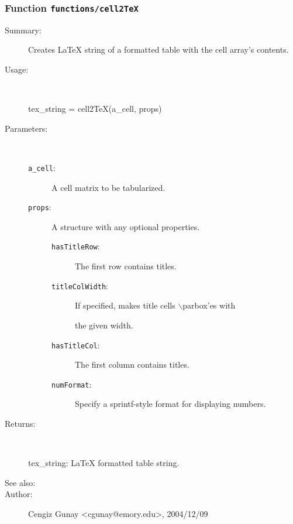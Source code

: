 \subsubsection[Function \texttt{cell2TeX}]{Function \texttt{functions/cell2TeX}}%
%
\label{ref_functions__cell2TeX}%
\hypertarget{ref_functions__cell2TeX}{}%
\begin{description}
\item[Summary:]Creates LaTeX string of a formatted table with the cell array's contents.
%
\item[Usage:]~%
\begin{lyxcode}%
tex\_string = cell2TeX(a\_cell, props)
%
\end{lyxcode}%
%
%
\item[Parameters:]~
\begin{description}%
\item[\texttt{a\_cell}:]
 A cell matrix to be tabularized.
\item[\texttt{props}:]
 A structure with any optional properties.
\begin{description}%
\item[\texttt{hasTitleRow}:]
 The first row contains titles.
\item[\texttt{titleColWidth}:]
 If specified, makes title cells $\backslash$parbox'es with

the given width.
\item[\texttt{hasTitleCol}:]
 The first column contains titles.
\item[\texttt{numFormat}:]
 Specify a sprintf-style format for displaying numbers.
\end{description}%
\end{description}%
%
\item[Returns:
]~

   tex\_string: LaTeX formatted table string.
%
%
\item[See also:]%
%
\item[Author:]%
Cengiz Gunay <cgunay@emory.edu>, 2004/12/09
%
\end{description}
\methodline%
